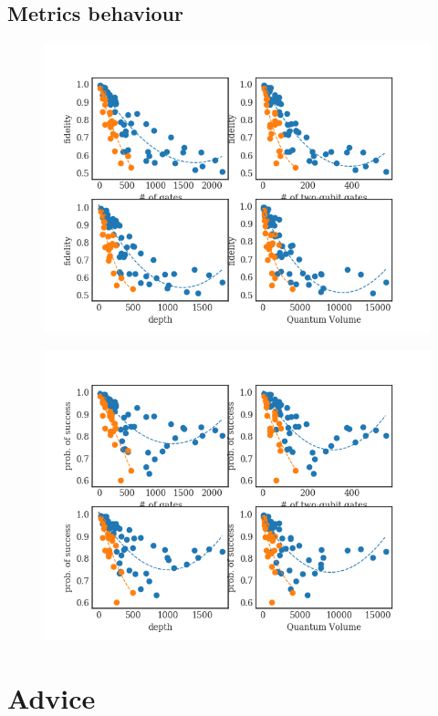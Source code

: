 \subsection{Metrics behaviour}
\label{sec:org9cbd9bb}

\begin{figure}[htbp]
\centering
\includegraphics[width=\textwidth]{figures/f_metrics_correlation.png}
\caption{\label{fig:orgeef9ab9}
}
\end{figure}

\begin{figure}[htbp]
\centering
\includegraphics[width=\textwidth]{figures/ps_metrics_correlation.png}
\caption{\label{fig:orgb4b1581}
}
\end{figure}

\section{Advice}
\label{sec:org01c1deb}
